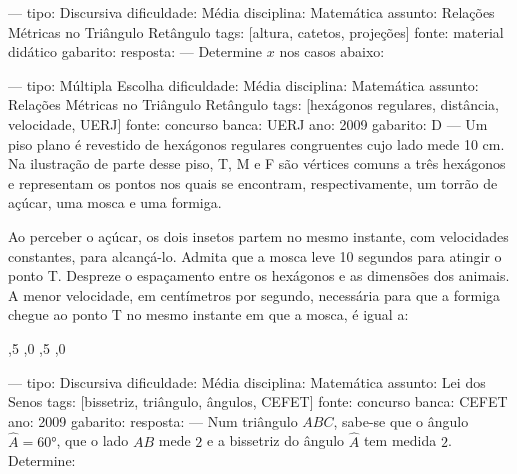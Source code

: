 ---
tipo: Discursiva
dificuldade: Média
disciplina: Matemática
assunto: Relações Métricas no Triângulo Retângulo
tags: [altura, catetos, projeções]
fonte: material didático
gabarito:
resposta:
---
\question
Determine $x$ nos casos abaixo:
\begin{parts}
\part
\part
\end{parts}

---
tipo: Múltipla Escolha
dificuldade: Média
disciplina: Matemática
assunto: Relações Métricas no Triângulo Retângulo
tags: [hexágonos regulares, distância, velocidade, UERJ]
fonte: concurso
banca: UERJ
ano: 2009
gabarito: D
---
\question
Um piso plano é revestido de hexágonos regulares congruentes cujo lado mede 10 cm. Na ilustração de parte desse piso, T, M e F são vértices comuns a três hexágonos e representam os pontos nos quais se encontram, respectivamente, um torrão de açúcar, uma mosca e uma formiga.


Ao perceber o açúcar, os dois insetos partem no mesmo instante, com velocidades constantes, para alcançá-lo. Admita que a mosca leve 10 segundos para atingir o ponto T. Despreze o espaçamento entre os hexágonos e as dimensões dos animais.
A menor velocidade, em centímetros por segundo, necessária para que a formiga chegue ao ponto T no mesmo instante em que a mosca, é igual a:
\begin{choices}
,5
,0
,5
,0
\end{choices}

---
tipo: Discursiva
dificuldade: Média
disciplina: Matemática
assunto: Lei dos Senos
tags: [bissetriz, triângulo, ângulos, CEFET]
fonte: concurso
banca: CEFET
ano: 2009
gabarito:
resposta:
---
\question
Num triângulo $ABC$, sabe-se que o ângulo $\hat{A} = 60°$, que o lado $AB$ mede $2$ e a bissetriz do ângulo $\hat{A}$ tem medida $2$. Determine:

